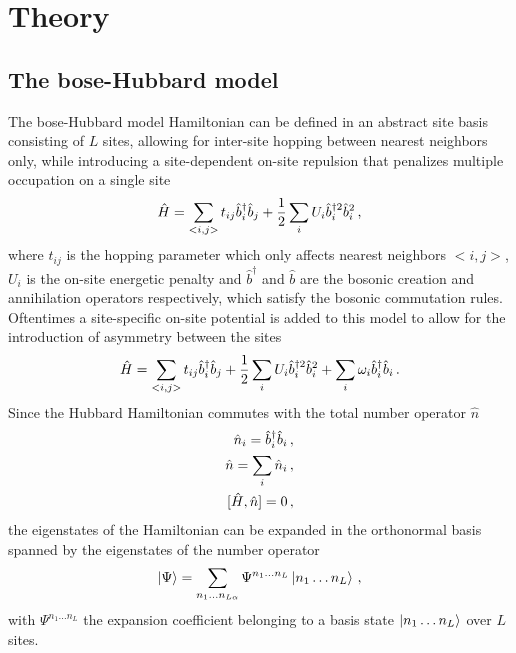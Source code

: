 \documentclass[twoside,twocolumn,9pt]{article}
\begin{document}
\section{Theory}
\subsection{The bose-Hubbard model}
The bose-Hubbard model Hamiltonian can be defined in an abstract site basis consisting of $L$ sites, allowing for inter-site hopping between nearest neighbors only, while introducing a site-dependent on-site repulsion that penalizes multiple occupation on a single site
\begin{equation}
  \hat{H} = \sum_{<i,j>} t_{ij}\hat{b}_i^\dagger \hat{b}_j + \frac{1}{2}\sum_i U_i\hat{b}_i^{\dagger 2} \hat{b}_i^{2} \thinspace ,
\end{equation}
where $t_{ij}$ is the hopping parameter which only affects nearest neighbors $<i,j>$, $U_i$ is the on-site energetic penalty and $\hat{b}^\dagger$ and $\hat{b}$ are the bosonic creation and annihilation operators respectively, which satisfy the bosonic commutation rules. Oftentimes a site-specific on-site potential is added to this model to allow for the introduction of asymmetry between the sites
\begin{equation}
  \hat{H} = \sum_{<i,j>} t_{ij}\hat{b}_i^\dagger \hat{b}_j + \frac{1}{2}\sum_i U_i\hat{b}_i^{\dagger 2} \hat{b}_i^{2} + \sum_i \omega_i \hat{b}_i^\dagger \hat{b}_i \thinspace .
  \label{eq:bose-hubbard-hamiltonian}
\end{equation}
Since the Hubbard Hamiltonian commutes with the total number operator $\hat{n}$
\begin{align}
  \hat{n}_i = \hat{b}_i^\dagger \hat{b}_i \thinspace &, \\
  \hat{n} = \sum_i \hat{n}_i \thinspace &, \\
  [\hat{H}, \hat{n}] = 0 \thinspace &,
\end{align}
the eigenstates of the Hamiltonian can be expanded in the orthonormal basis spanned by the eigenstates of the number operator
\begin{equation}
    \ket{\Psi}=\sum_{n_{1}\dots n_{L\alpha}} 
    \Psi^{n_{1} \ldots n_{L}}
    \ket{n_{1}\dots n_{L}} 
    \thinspace ,
    \label{theory:eigenstate}
\end{equation}
with $\Psi^{n_{1} \ldots n_{L}}$ the expansion coefficient belonging to a basis state $\ket{n_{1}\dots n_{L}}$ over $L$ sites.
\end{document}
